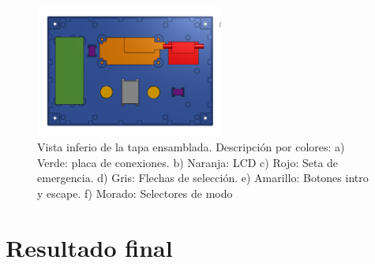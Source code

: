 \begin{figure}[h]%
    \centering 
        \includegraphics[width=0.55\textwidth]{04-caja/ensamblajetapainferior.png}
    \caption{Vista inferio de la tapa ensamblada. Descripción por colores: a) Verde: placa de 
    conexiones. b) Naranja: LCD c) Rojo: Seta de emergencia. d) Gris: Flechas de selección.
    e) Amarillo: Botones intro y escape. f) Morado: Selectores de modo}
    \label{fig:cajatapaensamblaje} 
\end{figure}

\section{Resultado final}